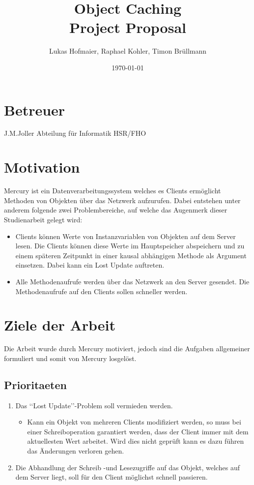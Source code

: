 \documentclass{article}
\title{Object Caching\\Project Proposal}
\author{Lukas Hofmaier, Raphael Kohler, Timon Brüllmann}
\date{\today}
\begin{document}
\maketitle
\vspace{1cm}
\section{Betreuer}
J.M.Joller  Abteilung für Informatik HSR/FHO

\section{Motivation}
Mercury ist ein Datenverarbeitungssystem welches es Clients ermöglicht Methoden von Objekten über das Netzwerk aufzurufen. Dabei entstehen unter anderem folgende zwei Problembereiche, auf welche das Augenmerk dieser Studienarbeit gelegt wird:

\begin{itemize}
\item Clients können Werte von Instanzvariablen von Objekten auf dem Server lesen. Die Clients können diese Werte im Hauptspeicher abspeichern und zu einem späteren Zeitpunkt in einer kausal abhängigen Methode als Argument einsetzen. Dabei kann ein Lost Update auftreten.
\item Alle Methodenaufrufe werden über das Netzwerk an den Server gesendet. Die Methodenaufrufe auf den Clients sollen schneller werden.
\end{itemize}

\section{Ziele der Arbeit}
Die Arbeit wurde durch Mercury motiviert, jedoch sind die Aufgaben allgemeiner formuliert und somit von Mercury losgelöst.
\subsection{Prioritaeten}
\label{sec:prioritaeten}

\begin{enumerate}
\item Das ‘‘Lost Update’’-Problem soll vermieden werden.
\begin{itemize}
\item Kann ein Objekt von mehreren Clients modifiziert werden, so muss bei einer Schreiboperation garantiert werden, dass der Client immer mit dem aktuellesten Wert arbeitet. Wird dies nicht geprüft kann es dazu führen das Änderungen verloren gehen.
\end{itemize}
\item Die Abhandlung der Schreib -und Lesezugriffe auf das Objekt, welches auf dem Server liegt, soll für den Client möglichst schnell passieren.
\end{enumerate}
\end{document}

